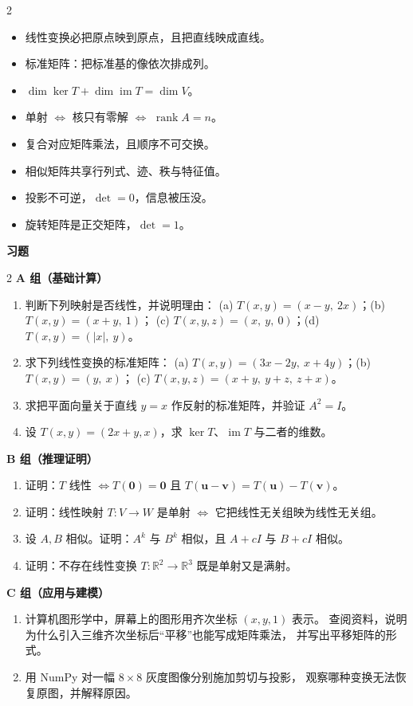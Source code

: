\documentclass[11pt,a4paper,openany]{ctexbook}
\DeclareMathOperator{\rank}{rank}
\newcommand{\Rnum}[1]{\mathbb{R}^{#1}}
\newcommand{\exhead}{%
  \par\addvspace{12pt}%
  {\noindent\sffamily\bfseries\Large\color{qing} 习题\par}%
  \vspace{-4pt}\noindent{\color{qing!32}\rule{\linewidth}{0.7pt}}\par\vspace{6pt}}
\begin{document}
\begin{chapkeys}
\small
\begin{multicols}{2}
\begin{itemize}[leftmargin=1.5em, itemsep=2pt]
\item 线性变换必把原点映到原点，且把直线映成直线。
\item 标准矩阵：把标准基的像依次排成列。
\item $\dim\ker T+\dim\operatorname{im}T=\dim V$。
\item 单射 $\Leftrightarrow$ 核只有零解 $\Leftrightarrow$ $\rank A=n$。
\item 复合对应矩阵乘法，且顺序不可交换。
\item 相似矩阵共享行列式、迹、秩与特征值。
\item 投影不可逆，$\det=0$，信息被压没。
\item 旋转矩阵是正交矩阵，$\det=1$。
\end{itemize}
\end{multicols}
\end{chapkeys}

\exhead
\begin{multicols}{2}
\small
\textbf{A 组（基础计算）}
\begin{enumerate}[leftmargin=1.6em, itemsep=3pt]
\item 判断下列映射是否线性，并说明理由：
      (a) $T(x,y)=(x-y,\ 2x)$；(b) $T(x,y)=(x+y,\ 1)$；
      (c) $T(x,y,z)=(x,\ y,\ 0)$；(d) $T(x,y)=(|x|,\ y)$。
\item 求下列线性变换的标准矩阵：
      (a) $T(x,y)=(3x-2y,\ x+4y)$；(b) $T(x,y)=(y,\ x)$；
      (c) $T(x,y,z)=(x+y,\ y+z,\ z+x)$。
\item 求把平面向量关于直线 $y=x$ 作反射的标准矩阵，并验证 $A^2=I$。
\item 设 $T(x,y)=(2x+y,x)$，求 $\ker T$、$\operatorname{im}T$ 与二者的维数。
\end{enumerate}
\textbf{B 组（推理证明）}
\begin{enumerate}[leftmargin=1.6em, itemsep=3pt, start=5]
\item 证明：$T$ 线性 $\Leftrightarrow T(\boldsymbol{0})=\boldsymbol{0}$
      且 $T(\boldsymbol{u}-\boldsymbol{v})=T(\boldsymbol{u})-T(\boldsymbol{v})$。
\item 证明：线性映射 $T:V\to W$ 是单射 $\Leftrightarrow$
      它把线性无关组映为线性无关组。
\item 设 $A,B$ 相似。证明：$A^k$ 与 $B^k$ 相似，且 $A+cI$ 与 $B+cI$ 相似。
\item 证明：不存在线性变换 $T:\Rnum{2}\to\Rnum{3}$ 既是单射又是满射。
\end{enumerate}
\textbf{C 组（应用与建模）}
\begin{enumerate}[leftmargin=1.6em, itemsep=3pt, start=9]
\item 计算机图形学中，屏幕上的图形用齐次坐标 $(x,y,1)$ 表示。
      查阅资料，说明为什么引入三维齐次坐标后“平移”也能写成矩阵乘法，
      并写出平移矩阵的形式。
\item 用 NumPy 对一幅 $8\times 8$ 灰度图像分别施加剪切与投影，
      观察哪种变换无法恢复原图，并解释原因。
\end{enumerate}
\end{multicols}
\end{document}
